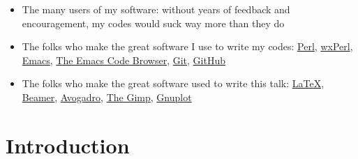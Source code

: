\documentclass[10pt, xcolor=x11names, compress]{beamer}
\begin{document}
\begin{frame}
  \begin{itemize}
    \footnotesize
  \item The many users of my software: without years of feedback and
    encouragement, my codes would suck way more than they do
  \item The folks who make the great software I use to write my codes:
    \href{http://www.perl.org}{\color{Blue4}Perl},
    \href{http://wxperl.sourceforge.net/}{\color{Blue4}wxPerl},
    \href{http://www.gnu.org/software/emacs/}{\color{Blue4}Emacs},
    \href{http://ecb.sourceforge.net}{\color{Blue4}The Emacs Code Browser},
    \href{http://git-scm.com/}{\color{Blue4}Git},
    \href{http://github.com/}{\color{Blue4}GitHub}
  \item The folks who make the great software used to write this talk:
    \href{http://tug.ctan.org}{\color{Blue4}\LaTeX},
    \href{http://latex-beamer.sourceforge.net}{\color{Blue4}Beamer},
    \href{http://avogadro.sourceforge.net}{\color{Blue4}Avogadro},
    \href{http://www.gimp.org}{\color{Blue4}The Gimp},
    \href{http://www.gnuplot.info}{\color{Blue4}Gnuplot}
  \end{itemize}
\end{frame}




\section[Introduction]{Introduction}
\end{document}
